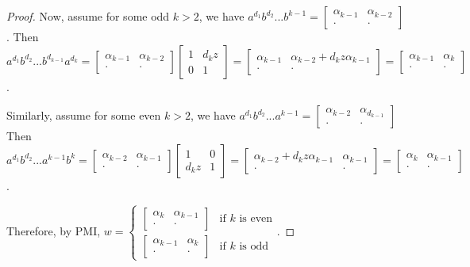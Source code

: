 \documentclass{amsart}
\theoremstyle{definition}
\begin{document}
\begin{proof}
Now, assume for some odd $k>2$, we have $a^{d_1}b^{d_2}...b^{k-1}=\begin{bmatrix}
	\alpha_{k-1}&\alpha_{k-2}\\\cdot&\cdot
\end{bmatrix}$. Then $a^{d_1}b^{d_2}...b^{d_{k-1}}a^{d_k}=\begin{bmatrix}
	\alpha_{k-1}&\alpha_{k-2}\\\cdot&\cdot
\end{bmatrix}\begin{bmatrix}
	1&d_kz\\0&1
\end{bmatrix}=\begin{bmatrix}
	\alpha_{k-1}&\alpha_{k-2}+d_kz\alpha_{k-1}\\\cdot&\cdot
\end{bmatrix}=\begin{bmatrix}
	\alpha_{k-1}&\alpha_k\\\cdot&\cdot
\end{bmatrix}$.

Similarly, assume for some even $k>2$, we have $a^{d_1}b^{d_2}...a^{k-1}=\begin{bmatrix}
	\alpha_{k-2}&\alpha_{d_{k-1}}\\\cdot&\cdot
\end{bmatrix}$ Then $a^{d_1}b^{d_2}...a^{k-1}b^k=\begin{bmatrix}
	\alpha_{k-2}&\alpha_{k-1}\\\cdot&\cdot
\end{bmatrix}\begin{bmatrix}
	1&0\\d_kz&1
\end{bmatrix}=\begin{bmatrix}
	\alpha_{k-2}+d_kz\alpha_{k-1}&\alpha_{k-1}\\\cdot&\cdot
\end{bmatrix}=\begin{bmatrix}
	\alpha_{k}&\alpha_{k-1}\\\cdot&\cdot
\end{bmatrix}$.

Therefore, by PMI, $w=\begin{cases}
	\begin{bmatrix}
		\alpha_k&\alpha_{k-1}\\\cdot&\cdot
	\end{bmatrix}&\text{if $k$ is even}\\
	\begin{bmatrix}
		\alpha_{k-1}&\alpha_k\\\cdot&\cdot
	\end{bmatrix}&\text{if $k$ is odd}
\end{cases}$.


\end{proof}
\end{document}
